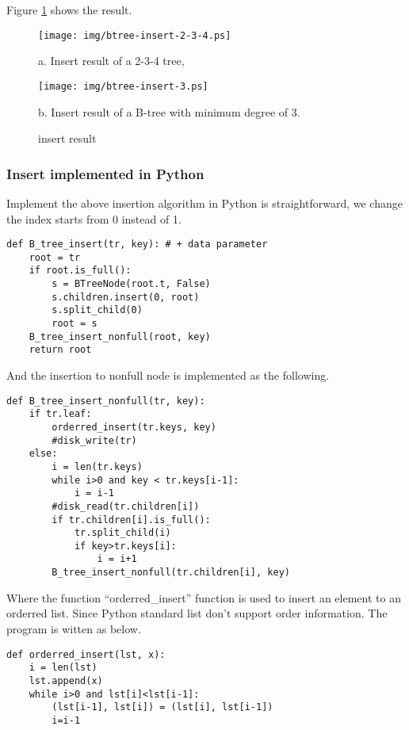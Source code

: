 \documentclass{article}
\begin{document}
Figure \ref{fig:btree-insert} shows the result.

\begin{figure}[htbp]
  \begin{center}
    \texttt{[image: img/btree-insert-2-3-4.ps]}

    a. Insert result of a 2-3-4 tree,

    \texttt{[image: img/btree-insert-3.ps]}

    b. Insert result of a B-tree with minimum degree of 3. 
    \caption{insert result} \label{fig:btree-insert}
  \end{center}
\end{figure}

\subsubsection*{Insert implemented in Python}
Implement the above insertion algorithm in Python is straightforward, we change
the index starts from 0 instead of 1.

\lstset{language=Python}
\begin{lstlisting}
def B_tree_insert(tr, key): # + data parameter
    root = tr
    if root.is_full():
        s = BTreeNode(root.t, False)
        s.children.insert(0, root)
        s.split_child(0)
        root = s
    B_tree_insert_nonfull(root, key)
    return root
\end{lstlisting}

And the insertion to nonfull node is implemented as the following.

\begin{lstlisting}
def B_tree_insert_nonfull(tr, key):
    if tr.leaf:
        orderred_insert(tr.keys, key)
        #disk_write(tr)
    else:
        i = len(tr.keys)
        while i>0 and key < tr.keys[i-1]:
            i = i-1
        #disk_read(tr.children[i])
        if tr.children[i].is_full():
            tr.split_child(i)
            if key>tr.keys[i]:
                i = i+1
        B_tree_insert_nonfull(tr.children[i], key)
\end{lstlisting}

Where the function ``orderred\_insert'' function is used to insert an element
to an orderred list. Since Python standard list don't support order information.
The program is witten as below.

\begin{lstlisting}
def orderred_insert(lst, x):
    i = len(lst)
    lst.append(x)
    while i>0 and lst[i]<lst[i-1]:
        (lst[i-1], lst[i]) = (lst[i], lst[i-1])
        i=i-1
\end{lstlisting}
\end{document}
